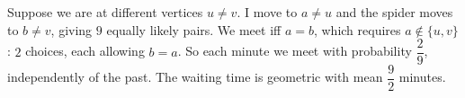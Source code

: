 Suppose we are at different vertices $u\ne v$. I move to $a\ne u$ and the spider moves to $b\ne v$, giving $9$ equally likely pairs. We meet iff $a=b$, which requires $a\notin\{u,v\}$: $2$ choices, each allowing $b=a$. So each minute we meet with probability $\dfrac29$, independently of the past. The waiting time is geometric with mean $\boxed{\dfrac92}$ minutes.
